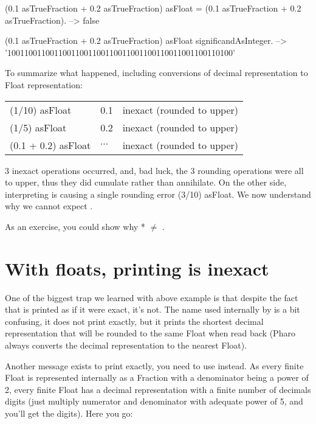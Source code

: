 \documentclass[a4paper,10pt,twoside]{book}
\begin{document}
\begin{code}{}
(0.1 asTrueFraction + 0.2 asTrueFraction) asFloat = (0.1 asTrueFraction + 0.2 asTrueFraction).
	--> false
	
(0.1 asTrueFraction + 0.2 asTrueFraction) asFloat significandAsInteger.
	--> '10011001100110011001100110011001100110011001100110100'
\end{code}

To summarize what happened, including conversions of decimal representation to Float representation:\\
\begin{tabular}{lll}
(1/10) asFloat & 0.1 & inexact (rounded to upper) \\
(1/5) asFloat & 0.2 & inexact (rounded to upper) \\
(0.1 + 0.2) asFloat & $\cdots$ & inexact (rounded to upper)  \\
\end{tabular}

3 inexact operations occurred, and, bad luck, the 3 rounding operations were all to upper, thus they did cumulate rather than annihilate.
On the other side, interpreting  is causing a single rounding error (3/10) asFloat.
We now understand why we cannot expect .

As an exercise, you could show why  *   $\neq$ .


\section{With floats, printing is inexact}

One of the biggest trap we learned with above example is that despite the fact that  is printed  as if it were exact, it's not.
The name  used internally by  is a bit confusing, it does not print exactly,
but it prints the shortest decimal representation that will be rounded
to the same Float when read back (Pharo always converts the decimal representation to the nearest Float).

Another message exists to print exactly, you need to use  instead.
As every finite Float is  represented internally as a Fraction with a
denominator being a power of 2, every finite Float has a decimal
representation with a finite number of decimals digits (just multiply
numerator and denominator with adequate power of 5, and you'll get the
digits). Here you go:
\end{document}
